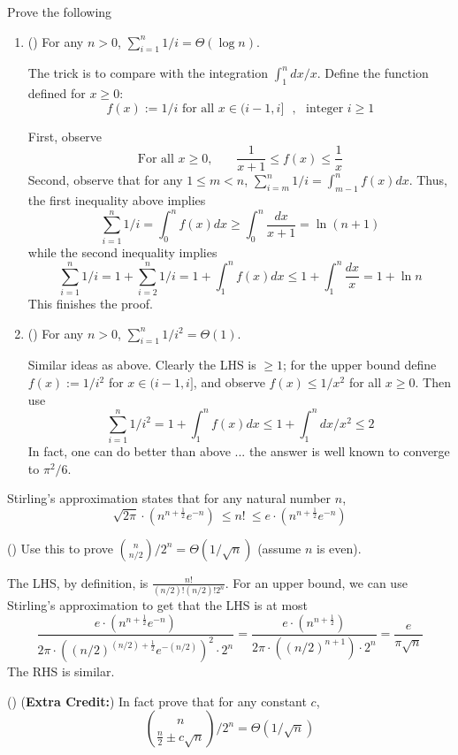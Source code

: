 \documentclass[11pt]{article}
\newcommand{\solution}[1]{\noindent {\color{blue} {\bf Solution:}} {\color{gray} {#1}}}
\newcommand{\solution}[1]{\ignore{#1}}
\begin{document}
\begin{exercise}
	Prove the following
	\begin{enumerate}
		\item (\Coffeecup\Coffeecup) For any $n > 0$, $\sum_{i=1}^n 1/i = \Theta(\log n)$.
		
		\solution{
			The trick is to compare with the integration $\int_{1}^{n} dx/x$.
			Define the function defined for $x\geq 0$:
			\[
			f(x) := 1/i \textrm{ for all $x\in (i-1,i]$ }, ~~~ \textrm{integer $i \geq 1$}
			\]

			First, observe
			\[
			\textrm{For all $x\ge 0$,} \qquad\frac{1}{x+1} \leq f(x) \leq \frac{1}{x}
			\]
			Second, observe that for any $1 \leq  m < n$, $\sum_{i=m}^n 1/i = \int_{m-1}^n f(x) dx$. 
			Thus, the first inequality above implies
			\[
			\sum_{i=1}^n 1/i = \int_{0}^n f(x)dx \geq \int_{0}^{n} \frac{dx}{x+1} = \ln(n+1)
			\]
			while the second inequality implies
			\[
			\sum_{i=1}^n 1/i = 1 + \sum_{i=2}^n 1/i = 1 + \int_{1}^n f(x)dx \leq 1 + \int_{1}^{n} \frac{dx}{x} = 1 + \ln n
			\]
			This finishes the proof.
			}
		
		\item (\Coffeecup) For any $n > 0$, $\sum_{i=1}^n 1/i^2 = \Theta(1)$.
		
			\solution{
				Similar ideas as above. Clearly the LHS is $\ge 1$; for the upper bound define $f(x) := 1/i^2$ for $x \in (i-1,i]$, and observe $f(x) \leq 1/x^2$ for all $x \geq 0$.
				Then use
				\[
				\sum_{i=1}^n 1/i^2 = 1 + \int_{1}^n f(x)dx \leq 1 + \int_{1}^n dx/x^2 \leq 2
				\]
				In fact, one can do better than above ... the answer is well known to converge to $\pi^2/6$.
				
			}
		
	\end{enumerate}
\end{exercise}

\vspace{2ex}

\begin{exercise} 
	
Stirling's approximation states that for any natural number $n$,
\[
\sqrt{2\pi}\cdot  \left(n^{n + \frac{1}{2}} e^{-n}\right) ~\leq n! ~\leq e \cdot \left(n^{n + \frac{1}{2}} e^{-n} \right)
\]	

(\Coffeecup \Coffeecup) Use this to prove  ${n \choose n/2}/2^n = \Theta(1/\sqrt{n})$ (assume $n$ is even).
	
	\solution{
		The LHS, by definition, is $\frac{n!}{(n/2)!(n/2)!2^n}$. For an upper bound, we can use Stirling's approximation to get that the LHS is at most
		\[
		\frac{e\cdot \left(n^{n + \frac{1}{2}} e^{-n} \right)}{2\pi \cdot \left((n/2)^{(n/2) + \frac{1}{2}} e^{-(n/2)}\right)^2 \cdot 2^n  } 
		= \frac{e\cdot \left(n^{n + \frac{1}{2}} \right)}{2\pi \cdot \left((n/2)^{n + 1} \right) \cdot 2^n  }  
		= \frac{e}{\pi \sqrt{n}}  
		\]
		The RHS is similar.
	}
	
(\Coffeecup \Coffeecup \Coffeecup) ({\bf Extra Credit:}) In fact prove that for any constant $c$, 
	\[
	{n \choose \frac{n}{2} \pm c\sqrt{n}}/2^n = \Theta(1/\sqrt{n})
	\]


\end{exercise}
\end{document}
